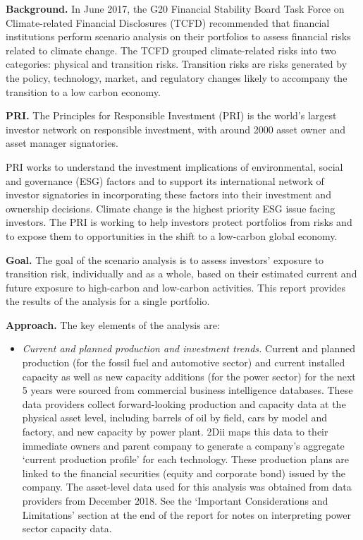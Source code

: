 \documentclass[10pt,table]{article}\usepackage[]{graphicx}\usepackage[]{color}
\begin{document}
	\begin{multicols}{2}
		\textbf{Background.} In June 2017, the G20 Financial Stability Board Task Force on Climate-related Financial Disclosures (TCFD) recommended that financial institutions perform scenario analysis on their portfolios to assess financial risks related to climate change. The TCFD grouped climate-related risks into two categories: physical and transition risks. Transition risks are risks generated by the policy, technology, market, and regulatory changes likely to accompany the transition to a low carbon economy.

		\textbf{PRI. }The Principles for Responsible Investment (PRI) is the world's largest investor network on responsible investment, with around 2000 asset owner and asset manager signatories. 

		PRI works to understand the investment implications of environmental, social and governance (ESG) factors and to support its international network of investor signatories in incorporating these factors into their investment and ownership decisions. Climate change is the highest priority ESG issue facing investors. The PRI is working to help investors protect portfolios from risks and to expose them to opportunities in the shift to a low-carbon global economy. 

		\textbf{Goal.} The goal of the scenario analysis is to assess investors' exposure to transition risk, individually and as a whole, based on their estimated current and future exposure to high-carbon and low-carbon activities. This report provides the results of the analysis for a single portfolio.

		\textbf{Approach.} The key elements of the analysis are:

		\begin{itemize}
			\item{\textit{Current and planned production and investment trends.} Current and planned production (for the fossil fuel and automotive sector) and current installed capacity as well as new capacity additions (for the power sector) for the next 5 years were sourced from commercial business intelligence databases. These data providers collect forward-looking production and capacity data at the physical asset level, including barrels of oil by field, cars by model and factory, and new capacity by power plant. 2Dii maps this data to their immediate owners and parent company to generate a company's aggregate `current production profile' for each technology. These production plans are linked to the financial securities (equity and corporate bond) issued by the company. The asset-level data used for this analysis was obtained from data providers from December 2018. See the `Important Considerations and Limitations' section at the end of the report for notes on interpreting power sector capacity data.}


\end{itemize}
\end{multicols}
\end{document}
